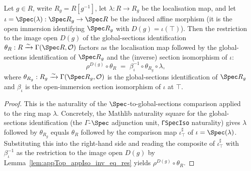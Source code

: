 \begin{lemma}\leanok
  \label{lem:key_morph}
  Let \(g \in R\), write \(R_g = R[g^{-1}]\), let \(\lambda : R \to R_g\) be the localisation map, and let
  \(\iota = \Spec(\lambda) : \Spec R_g \to \Spec R\) be the induced affine morphism (it is the open
  immersion identifying \(\Spec R_g\) with \(D(g) = \iota(\top)\)). Then the restriction to the image
  open \(D(g)\) of the global-sections identification
  \(\theta_R : R \xrightarrow{\sim} \Gamma(\Spec R, \mathcal{O})\) factors as the localisation map
  followed by the global-sections identification of \(\Spec R_g\) and the (inverse) section isomorphism
  of \(\iota\):
  \[
    \rho^{D(g)} \circ \theta_R
    \;=\;
    \beta_\iota^{-1} \circ \theta_{R_g} \circ \lambda,
  \]
  where \(\theta_{R_g} : R_g \xrightarrow{\sim} \Gamma(\Spec R_g, \mathcal{O})\) is the global-sections
  identification of \(\Spec R_g\) and \(\beta_\iota\) is the open-immersion section isomorphism of
  \(\iota\) at \(\top\).
\end{lemma}
\begin{proof}
  \leanok
  This is the naturality of the \(\Spec\)-to-global-sections comparison applied to the ring map
  \(\lambda\). Concretely, the Mathlib naturality square for the global-sections identification (the
  \(\Gamma\)-\(\Spec\) adjunction unit, \texttt{ΓSpecIso} naturality) gives
  \(\lambda \) followed by \(\theta_{R_g}\) equals \(\theta_R\) followed by the comparison map
  \(\iota^{\sharp}_{\top}\) of \(\iota = \Spec(\lambda)\). Substituting this into the right-hand side and
  reading the composite of \(\iota^{\sharp}_{\top}\) with \(\beta_\iota^{-1}\) as the restriction to the
  image open \(D(g)\) by Lemma~\ref{lem:appTop_appIso_inv_eq_res} yields \(\rho^{D(g)} \circ \theta_R\).
\end{proof}

